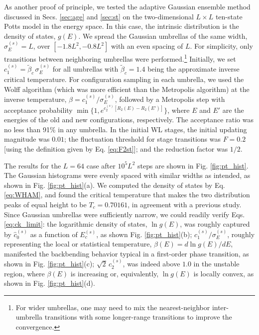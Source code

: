 \documentclass[preprint, superscriptaddress, floatfix]{revtex4-1}
\newcommand{\note}[1]{{\color{DarkGreen}\footnotesize \textsc{Note.} #1}}
\begin{document}
As another proof of principle,
we tested the adaptive Gaussian ensemble method
discussed in Secs. \ref{sec:age} and \ref{sec:st}
on the two-dimensional $L\times L$ ten-state
Potts model\cite{wu1982, newman, *landau_binder, wang2001, wang2001pre}
in the energy space.
%
In this case, %
the intrinsic distribution is
the density of states, $g(E)$.
%
We spread the Gaussian umbrellas
of the same width, $\sigma_E^{(s)} = L$, over $[-1.8L^2, -0.8L^2]$
with an even spacing of $L$.
%
For simplicity, only transitions between neighboring
umbrellas were performed.\footnote{For
  wider umbrellas,
  one may need to mix the nearest-neighbor inter-umbrella transitions
  with some longer-range transitions
  to improve the convergence.}
%
%
Initially, we set
$c_1^{(s)} = \tilde \beta_c \, \sigma_E^{(s)}$
for all umbrellas
with $\tilde \beta_c = 1.4$
being the approximate inverse critical temperature.
%
For configuration sampling in each umbrella,
we used the Wolff algorithm\cite{wolff1989, newman, *landau_binder}
(which was more efficient than the Metropolis algorithm)
at the inverse temperature, $\beta = c_1^{(s)}/\sigma_E^{(s)}$,
followed by a Metropolis step with
acceptance probability
$\min\bigl\{1, e^{c_2^{(s)} [R_2(E) - R_2(E')]} \bigr\}$,
where $E$ and $E'$ are the energies of
the old and new configurations, respectively.
%
The acceptance ratio was no less than 91\% in any umbrella.
%
In the initial WL stages,
the initial updating magnitude was $0.01$;
the fluctuation threshold for stage transitions
was $F = 0.2$ [using the definition given by Eq. \eqref{eq:F2st}];
and the reduction factor was $1/2$.

The results for the $L = 64$ case
after $10^5 L^2$ steps are shown
in Fig. \ref{fig:pt_hist}.
%
The Gaussian histograms were evenly spaced with similar widths as intended,
as shown in Fig. \ref{fig:pt_hist}(a).
%
We computed the density of states by Eq. \eqref{eq:WHAM},
and found the critical temperature
that makes the two distribution peaks of equal height
to be $T_c = 0.70161$,
in agreement with a previous study\cite{wang2001pre}.
%
Since Gaussian umbrellas were sufficiently narrow,
we could readily verify
Eqs. \eqref{eq:ck_limit}:
the logarithmic density of states, $\ln g(E)$,
was roughly captured
by $\hat c_0^{(s)}$ as a function of $E_c^{(s)}$,
as shown Fig. \ref{fig:pt_hist}(b);
%
$c_1^{(s)}/\sigma_E^{(s)}$, roughly representing
the local or statistical temperature, $\beta(E) = d\ln g(E)/dE$,
manifested the backbending behavior\cite{kim2006, *kim2007, kim2010}
typical in a first-order phase transition,
as shown in Fig. \ref{fig:pt_hist}(c);
%
$\sqrt 2 \, c_2^{(s)}$,
was indeed above $1.0$
in the unstable region,
where $\beta(E)$ is increasing or, equivalently,
$\ln g(E)$ is locally convex,
as shown in Fig. \ref{fig:pt_hist}(d).
\end{document}
